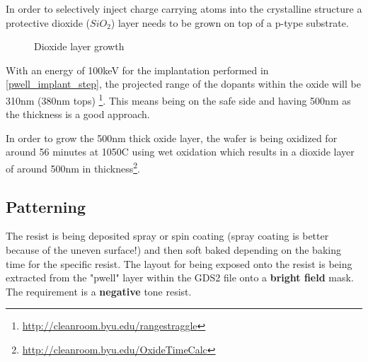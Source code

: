 In order to selectively inject charge carrying atoms into the crystalline structure a protective dioxide ($SiO_2$) layer needs to be grown on top of a p-type substrate.

\begin{figure}[H]
	\centering
	\begin{tikzpicture}[node distance = 3cm, auto, thick,scale=\CrossSectionOnly, every node/.style={transform shape}]
		
	\end{tikzpicture}
	\begin{tikzpicture}[node distance = 3cm, auto, thick,scale=\CrossSectionOnly, every node/.style={transform shape}]
		
	\end{tikzpicture}
	\caption{Dioxide layer growth}
\end{figure}

With an energy of 100keV for the implantation performed in \autoref{pwell_implant_step}, the projected range of the dopants within the oxide will be 310nm (380nm tops) \footnote{\url{http://cleanroom.byu.edu/rangestraggle}}.
This means being on the safe side and having 500nm as the thickness is a good approach.

In order to grow the 500nm thick oxide layer, the wafer is being oxidized for around 56 minutes at 1050\degree C using wet oxidation which results in a dioxide layer of around 500nm in thickness\footnote{\url{http://cleanroom.byu.edu/OxideTimeCalc}}.

\subsection{Patterning}
The resist is being deposited spray or spin coating (spray coating is better because of the uneven surface!) and then soft baked depending on the baking time for the specific resist.
The layout for being exposed onto the resist is being extracted from the "pwell" layer within the GDS2 file onto a \textbf{bright field} mask.
The requirement is a \textbf{negative} tone resist.

